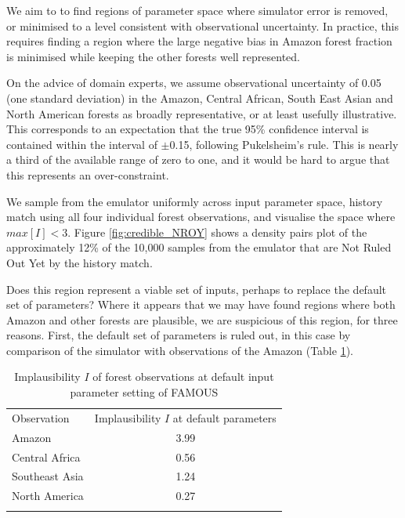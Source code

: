 \documentclass[esd, article]{copernicus} %
\begin{document}


We aim to to find regions of parameter space where simulator error is removed, or minimised to a level consistent with observational uncertainty. In practice, this requires finding a region where the large negative bias in Amazon forest fraction is minimised while keeping the other forests well represented.

On the advice of domain experts, we assume observational uncertainty of 0.05 (one standard deviation) in the Amazon, Central African, South East Asian and North American forests as broadly representative, or at least usefully illustrative. This corresponds to an expectation that the true 95\% confidence interval is contained within the interval of $\pm$0.15, following Pukelsheim's rule. This is nearly a third of the available range of zero to one, and it would be hard to argue that this represents an over-constraint.

We sample from the emulator uniformly across input parameter space, history match using all four individual forest observations, and visualise the space where $max[I] < 3$. Figure \ref{fig:credible_NROY} shows a density pairs plot of the approximately 12\% of the 10,000 samples from the emulator that are Not Ruled Out Yet by the history match.


Does this region represent a viable set of inputs, perhaps to replace the default set of parameters? Where it appears that we may have found regions where both Amazon and other forests are plausible, we are suspicious of this region, for three reasons. First, the default set of parameters is ruled out, in this case by comparison of the simulator with observations of the Amazon (Table \ref{tab:default_parameter_implausibility}).


\begin{table}[t]
\caption{Implausibility $I$ of forest observations at default input parameter setting of FAMOUS}\label{tab:default_parameter_implausibility}
\begin{tabular}{lc}

\tophline
Observation &  Implausibility $I$ at default parameters \\
Amazon & 3.99 \\
Central Africa & 0.56 \\
Southeast Asia & 1.24 \\
North America & 0.27 \\
\bottomhline
\end{tabular}
\belowtable{} %
\end{table}
\end{document}
